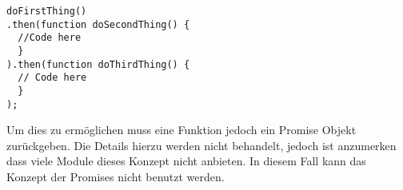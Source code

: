 \begin{verbatim}
doFirstThing()
.then(function doSecondThing() {
  //Code here
  }
).then(function doThirdThing() {
  // Code here
  }
);
\end{verbatim}

Um dies zu ermöglichen muss eine Funktion jedoch ein Promise Objekt
zurückgeben. Die Details hierzu werden nicht behandelt, jedoch ist
anzumerken dass viele Module dieses Konzept nicht anbieten. In diesem
Fall kann das Konzept der Promises nicht benutzt werden.
